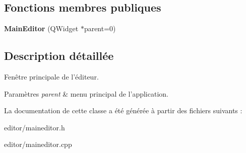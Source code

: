 \subsection*{Fonctions membres publiques}
\begin{DoxyCompactItemize}
\item 
\hypertarget{classMainEditor_a58a308ba8043e53ea5525e87540b0a71}{{\bfseries Main\+Editor} (Q\+Widget $\ast$parent=0)}\label{classMainEditor_a58a308ba8043e53ea5525e87540b0a71}

\end{DoxyCompactItemize}


\subsection{Description détaillée}
Fenêtre principale de l’éditeur. 


\begin{DoxyParams}{Paramètres}
{\em parent} & menu principal de l’application. \\
\hline
\end{DoxyParams}


La documentation de cette classe a été générée à partir des fichiers suivants \+:\begin{DoxyCompactItemize}
\item 
editor/maineditor.\+h\item 
editor/maineditor.\+cpp\end{DoxyCompactItemize}
